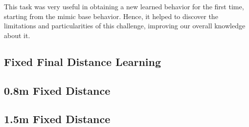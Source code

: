 This task was very useful in obtaining a new learned behavior for the first time, starting from the mimic base behavior. Hence, it helped to discover the limitations and particularities of this challenge, improving our overall knowledge about it.

\subsection{Fixed Final Distance Learning}

\subsection{0.8m Fixed Distance}

\subsection{1.5m Fixed Distance}




